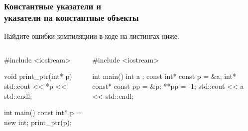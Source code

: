 \documentclass[compress, 8pt]{beamer}
\begin{document}
\begin{frame}[fragile]

    \frametitle{Константные указатели и \\ указатели на константные объекты}

    \begin{task}
        Найдите ошибки компиляциии в коде на листингах ниже.
    \end{task}

    \begin{columns}[T]

        \begin{column}{0.5\textwidth}

            \begin{myinplacelisting}[minted language=cpp]
#include <iostream>

void print_ptr(int* p) {
    std::cout << *p
        << std::endl;
}

int main() {
    const int* p = new int{};
    print_ptr(p);
}
            \end{myinplacelisting}

        \end{column}

        \begin{column}{0.5\textwidth}

            \begin{myinplacelisting}[minted language=cpp]
#include <iostream>

int main() {
    int a {};
    const int* const p = &a;
    int* const* const pp = &p;
    **pp = -1;
    std::cout << a
        << std::endl;
}
            \end{myinplacelisting}

        \end{column}

    \end{columns}

\end{frame}
\end{document}
